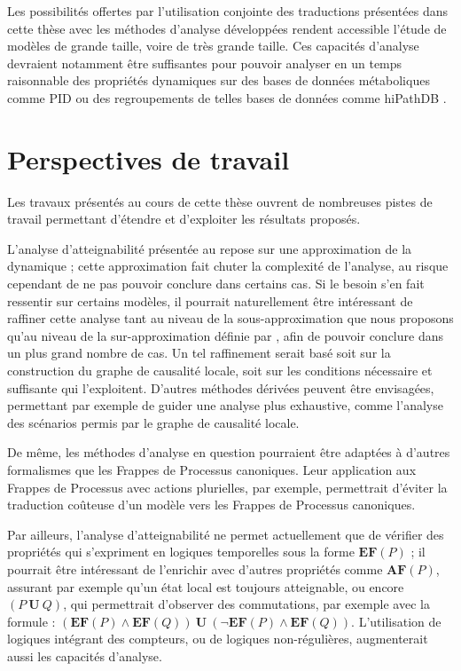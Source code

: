 \myskip

Les possibilités offertes par l'utilisation conjointe des traductions présentées
dans cette thèse avec les méthodes d'analyse développées
rendent accessible l'étude de modèles de grande taille, voire de très grande taille.
Ces capacités d'analyse devraient notamment être suffisantes pour pouvoir analyser
en un temps raisonnable des propriétés dynamiques sur des bases de données métaboliques
comme PID \cite{schaefer09pid}
ou des regroupements de telles bases de données comme hiPathDB \cite{yu12hipathdb}.


\section{Perspectives de travail}

Les travaux présentés au cours de cette thèse ouvrent de nombreuses pistes de travail
permettant d'étendre et d'exploiter les résultats proposés.

\myskip

% 

L'analyse d'atteignabilité présentée au 
repose sur une approximation de la dynamique ;
cette approximation fait chuter la complexité de l'analyse,
au risque cependant de ne pas pouvoir conclure dans certains cas.
Si le besoin s'en fait ressentir sur certains modèles,
il pourrait naturellement être intéressant de raffiner cette analyse tant au niveau
de la sous-approximation que nous proposons qu'au niveau
de la sur-approximation définie par ,
afin de pouvoir conclure dans un plus grand nombre de cas.
Un tel raffinement serait basé soit sur la construction du graphe de causalité locale,
soit sur les conditions nécessaire et suffisante qui l'exploitent.
D'autres méthodes dérivées peuvent être envisagées,
permettant par exemple de guider une analyse plus exhaustive,
comme l'analyse des scénarios permis par le graphe de causalité locale.

De même, les méthodes d'analyse en question pourraient être adaptées à d'autres formalismes
que les Frappes de Processus canoniques.
Leur application aux Frappes de Processus avec actions plurielles, par exemple,
permettrait d'éviter la traduction coûteuse d'un modèle vers les Frappes de Processus canoniques.

Par ailleurs, l'analyse d'atteignabilité ne permet actuellement que de vérifier des propriétés
qui s'expriment en logiques temporelles sous la forme $\mathbf{EF}(P)$ ;
il pourrait être intéressant de l'enrichir avec d'autres propriétés comme
$\mathbf{AF}(P)$, assurant par exemple qu'un état local est toujours atteignable,
ou encore $(P\:\mathbf{U}\:Q)$, qui permettrait d'observer des commutations,
par exemple avec la formule :
$(\mathbf{EF}(P) \wedge \mathbf{EF}(Q))\:\mathbf{U}\:(\neg\mathbf{EF}(P) \wedge \mathbf{EF}(Q))$.
L'utilisation de logiques intégrant des compteurs,
ou de logiques non-régulières,
augmenterait aussi les capacités d'analyse.

